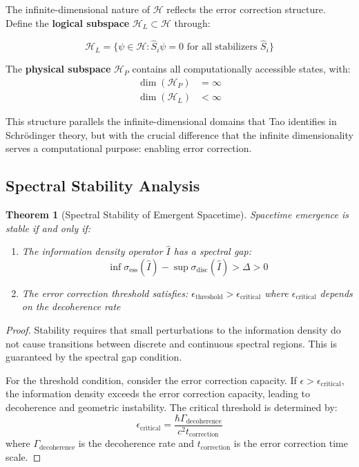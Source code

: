 \documentclass[12pt]{article}
\newtheorem{theorem}{Theorem}[section]
\begin{document}
The infinite-dimensional nature of $\mathcal{H}$ reflects the error correction structure. Define the \textbf{logical subspace} $\mathcal{H}_L \subset \mathcal{H}$ through:

\begin{equation}
\mathcal{H}_L = \{\psi \in \mathcal{H} : \hat{S}_i \psi = 0 \text{ for all stabilizers } \hat{S}_i\}
\end{equation}

The \textbf{physical subspace} $\mathcal{H}_P$ contains all computationally accessible states, with:
\begin{align}
\dim(\mathcal{H}_P) &= \infty \\
\dim(\mathcal{H}_L) &< \infty
\end{align}

This structure parallels the infinite-dimensional domains that Tao identifies in Schrödinger theory, but with the crucial difference that the infinite dimensionality serves a computational purpose: enabling error correction.

\subsection{Spectral Stability Analysis}

\begin{theorem}[Spectral Stability of Emergent Spacetime]
Spacetime emergence is stable if and only if:
\begin{enumerate}
\item The information density operator $\hat{I}$ has a spectral gap: 
\begin{equation}
\inf \sigma_{\text{ess}}(\hat{I}) - \sup \sigma_{\text{disc}}(\hat{I}) > \Delta > 0
\end{equation}
\item The error correction threshold satisfies: $\epsilon_{\text{threshold}} > \epsilon_{\text{critical}}$ where $\epsilon_{\text{critical}}$ depends on the decoherence rate
\end{enumerate}
\end{theorem}

\begin{proof}
Stability requires that small perturbations to the information density do not cause transitions between discrete and continuous spectral regions. This is guaranteed by the spectral gap condition.

For the threshold condition, consider the error correction capacity. If $\epsilon > \epsilon_{\text{critical}}$, the information density exceeds the error correction capacity, leading to decoherence and geometric instability. The critical threshold is determined by:
\begin{equation}
\epsilon_{\text{critical}} = \frac{\hbar \Gamma_{\text{decoherence}}}{c^2 t_{\text{correction}}}
\end{equation}
where $\Gamma_{\text{decoherence}}$ is the decoherence rate and $t_{\text{correction}}$ is the error correction time scale.
\end{proof}
\end{document}
